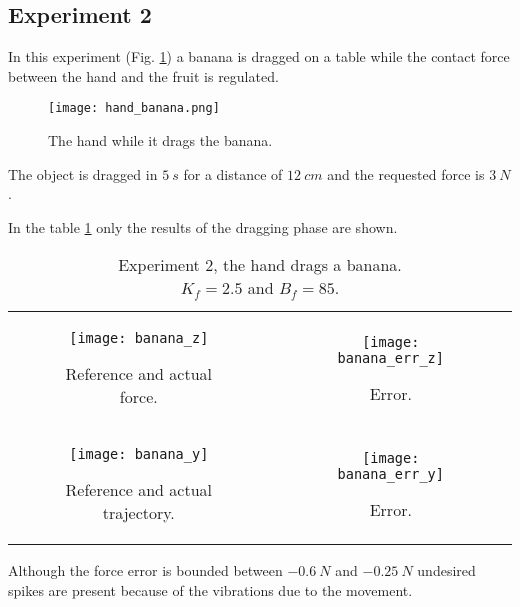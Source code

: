 \subsection{Experiment 2}
In this experiment (Fig. \ref{fig:hand_banana}) a banana is dragged 
on a table while the contact force between the hand and the fruit is regulated.
\begin{figure}[h]
  \centering
  \texttt{[image: hand\_banana.png]}
  \caption{The hand while it drags the banana. \label{fig:hand_banana}}
\end{figure}
\par
The object is dragged in $\SI{5}{s}$ for a distance of $\SI{12}{cm}$ and the requested force is $\SI{3}{N}$.
\par
In the table \ref{fig:banana} only the results of the dragging phase are shown.
\begin{table}[h]
  \begin{tabular}{cc}
    \begin{subfigure}{0.5\textwidth}
      \centering
      \texttt{[image: banana\_z]}
      \caption{Reference and actual force. \label{fig:banana_z}}
    \end{subfigure}&
    \begin{subfigure}{0.5\textwidth}
      \centering
      \texttt{[image: banana\_err\_z]}
      \caption{Error. \label{fig:banana_error_z}}
    \end{subfigure}\\
    \begin{subfigure}{0.5\textwidth}
      \centering
      \texttt{[image: banana\_y]}
      \caption{Reference and actual trajectory. \label{fig:banana_y}}
    \end{subfigure}&
    \begin{subfigure}{0.5\textwidth}
      \centering
      \texttt{[image: banana\_err\_y]}
      \caption{Error. \label{fig:banana_error_y}}
    \end{subfigure}
  \end{tabular}
  \caption{Experiment 2, the hand drags a banana.\\
  $K_f = 2.5$ and $B_f = 85$.}\label{fig:banana}
\end{table}
\par
Although the force error is bounded between $\SI{-0.6}{N}$ and 
$\SI{-0.25}{N}$ undesired spikes are present because of
the vibrations due to the movement.
\newpage
